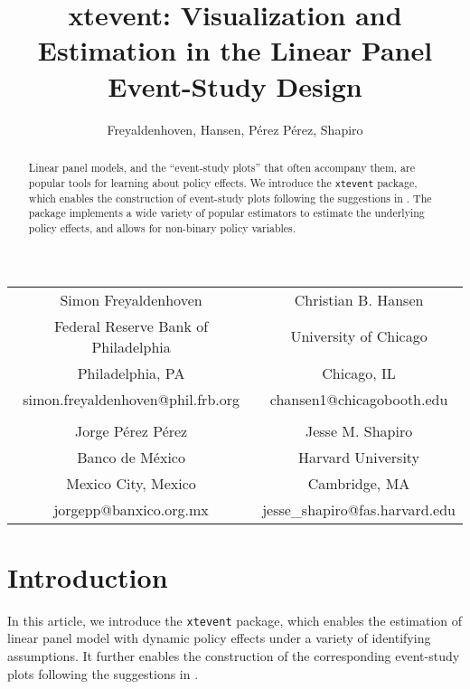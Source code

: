 \documentclass[bib]{./sty/statapress}
\begin{document}
\newcommand{\xtevent}{\texttt{xtevent }}
\newcommand{\xteventplot}{\texttt{xteventplot }}

\author{Freyaldenhoven, Hansen, P\'erez P\'erez, Shapiro}{%
    \begin{tabular}{cc}
    Simon Freyaldenhoven & Christian B. Hansen \\
     Federal Reserve Bank of Philadelphia & University of Chicago \\
     Philadelphia, PA & Chicago, IL \\
     simon.freyaldenhoven@phil.frb.org & chansen1@chicagobooth.edu \\
     \\
    Jorge P\'erez P\'erez & Jesse M. Shapiro \\
    Banco de México & Harvard University \\
    Mexico City, Mexico & Cambridge, MA \\
    jorgepp@banxico.org.mx & jesse\_shapiro@fas.harvard.edu
    \end{tabular}
}
\title[xtevent]{xtevent: Visualization and Estimation in the Linear Panel Event-Study Design}
\maketitle

\begin{abstract}
Linear panel models, and the “event-study plots” that often accompany them, are popular tools for learning about policy effects. We introduce the \texttt{xtevent} package, which enables the construction of event-study plots following the suggestions in \cite{freyaldenhoven2021visualization}. The package implements a wide variety of popular estimators to estimate the underlying policy effects, and allows for non-binary policy variables.

\end{abstract}


\section{Introduction}
\label{sec:intro}
In this article, we introduce the \texttt{xtevent} package, which enables the estimation of linear panel model with dynamic policy effects under a variety of identifying assumptions. It further enables the construction of the corresponding event-study plots following the suggestions in \cite{freyaldenhoven2021visualization}.
\end{document}
